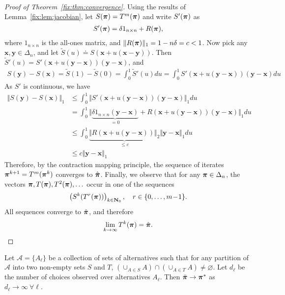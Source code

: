 \begin{proof}[Proof of Theorem~\ref{fix:thm:convergence}]
Using the results of Lemma~\ref{fix:lem:jacobian}, let $S(\bm{\pi}) = T^m(\bm{\pi})$ and write $S'(\bm{\pi})$ as
\begin{align}
S'(\bm{\pi}) = \delta 1_{n \times n} + R(\bm{\pi}),
\end{align}
where $1_{n \times n}$ is the all-ones matrix, and $\Vert R(\bm{\pi}) \Vert_1 = 1 - n\delta = c < 1$.
Now pick any $\bm{x}, \bm{y} \in \Delta_n$, and let $\tilde{S}(u) \doteq S(\bm{x} + u(\bm{x} - \bm{y}))$.
Then $\tilde{S}'(u) = S'(\bm{x} + u(\bm{y} - \bm{x}))(\bm{y} - \bm{x})$, and
\begin{align}
S(\bm{y}) - S(\bm{x}) = \tilde{S}(1) - \tilde{S}(0) = \int_0^1 \tilde{S}'(u) du = \int_0^1 S'(\bm{x} + u(\bm{y} - \bm{x}))(\bm{y} - \bm{x}) du
\end{align}
As $S'$ is continuous, we have
\begin{align}
\Vert S(\bm{y}) - S(\bm{x}) \Vert_1 &\le \int_0^1 \Vert S'(\bm{x} + u(\bm{y} - \bm{x}))(\bm{y} - \bm{x}) \Vert_1 du \\
&=   \int_0^1 \Vert \underbrace{\delta 1_{n \times n}(\bm{y} - \bm{x})}_{= 0} + R(\bm{x} + u(\bm{y} - \bm{x}))(\bm{y} - \bm{x}) \Vert_1 du \\
&\le \int_0^1 \underbrace{\Vert R(\bm{x} + u(\bm{y} - \bm{x})) \Vert_2}_{\le c} \Vert \bm{y} - \bm{x} \Vert_1 du \\
&\le c \Vert \bm{y} - \bm{x} \Vert_1
\end{align}
Therefore, by the contraction mapping principle, the sequence of iterates $\bm{\pi}^{k+1} = T^m(\bm{\pi}^k)$ converges to $\hat{\bm{\pi}}$.
Finally, we observe that for any $\bm{\pi} \in \Delta_n$, the vectors $\bm{\pi}, T(\bm{\pi}), T^2(\bm{\pi}), \ldots$ occur in one of the sequences
\begin{align}
\left( S^k(T^r(\bm{\pi})) \right)_{k \in \mathbf{N}_0}, \quad r \in \{ 0, \ldots, m\!-\!1 \}.
\end{align}
All sequences converge to $\hat{\bm{\pi}}$, and therefore
\begin{align}
\lim_{k \to \infty} T^k(\bm{\pi}) = \hat{\bm{\pi}}.
\end{align}
\end{proof}

\begin{theorem}
\label{fix:thm:consistency}
Let $\mathcal{A} = \{ A_\ell \}$ be a collection of sets of alternatives such that for any partition of $\mathcal{A}$ into two non-empty sets $S$ and $T$, $\left( \cup_{A \in S} A \right) \cap \left( \cup_{A \in T} A \right) \ne \varnothing$.
Let $d_\ell$ be the number of choices observed over alternatives $A_\ell$.
Then $\bar{\bm{\pi}} \to \bm{\pi}^*$ as $d_\ell \to \infty \ \forall \ell$.
\end{theorem}

